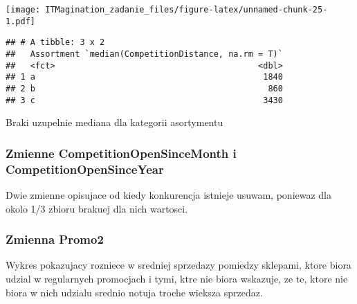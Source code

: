 \documentclass[]{article}
\newenvironment{Shaded}{\begin{snugshade}}{\end{snugshade}}
\newcommand{\DataTypeTok}[1]{\textcolor[rgb]{0.13,0.29,0.53}{#1}}
\newcommand{\KeywordTok}[1]{\textcolor[rgb]{0.13,0.29,0.53}{\textbf{#1}}}
\newcommand{\NormalTok}[1]{#1}
\newcommand{\OperatorTok}[1]{\textcolor[rgb]{0.81,0.36,0.00}{\textbf{#1}}}
\newcommand{\StringTok}[1]{\textcolor[rgb]{0.31,0.60,0.02}{#1}}
\begin{document}
\texttt{[image: ITMagination\_zadanie\_files/figure-latex/unnamed-chunk-25-1.pdf]}

\begin{Shaded}
\end{Shaded}

\begin{verbatim}
## # A tibble: 3 x 2
##   Assortment `median(CompetitionDistance, na.rm = T)`
##   <fct>                                         <dbl>
## 1 a                                              1840
## 2 b                                               860
## 3 c                                              3430
\end{verbatim}

Braki uzupelnie mediana dla kategorii asortymentu

\hypertarget{zmienne-competitionopensincemonth-i-competitionopensinceyear}{%
\subsubsection{Zmienne CompetitionOpenSinceMonth i
CompetitionOpenSinceYear}\label{zmienne-competitionopensincemonth-i-competitionopensinceyear}}

Dwie zmienne opisujace od kiedy konkurencja istnieje usuwam, poniewaz
dla okolo 1/3 zbioru brakuej dla nich wartosci.

\hypertarget{zmienna-promo2}{%
\subsubsection{Zmienna Promo2}\label{zmienna-promo2}}

Wykres pokazujacy rozniece w sredniej sprzedazy pomiedzy sklepami, ktore
biora udzial w regularnych promocjach i tymi, ktre nie biora wskazuje,
ze te, ktore nie biora w nich udzialu srednio notuja troche wieksza
sprzedaz.

\begin{Shaded}
\end{Shaded}
\end{document}
